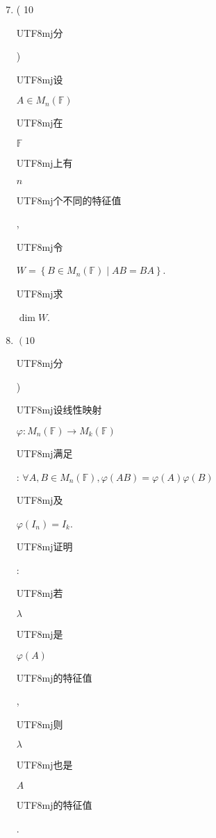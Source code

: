 \documentclass[10pt]{article}
\begin{document}
\begin{enumerate}
  \setcounter{enumi}{6}
  \item ( 10 \begin{CJK}{UTF8}{mj}分\end{CJK}) \begin{CJK}{UTF8}{mj}设\end{CJK} $A \in M_{n}(\mathbb{F})$ \begin{CJK}{UTF8}{mj}在\end{CJK} $\mathbb{F}$ \begin{CJK}{UTF8}{mj}上有\end{CJK} $n$ \begin{CJK}{UTF8}{mj}个不同的特征值\end{CJK}, \begin{CJK}{UTF8}{mj}令\end{CJK} $W=\left\{B \in M_{n}(\mathbb{F}) \mid A B=B A\right\}$. \begin{CJK}{UTF8}{mj}求\end{CJK} $\operatorname{dim} W$.

  \item $\left(10\right.$ \begin{CJK}{UTF8}{mj}分\end{CJK}) \begin{CJK}{UTF8}{mj}设线性映射\end{CJK} $\varphi: M_{n}(\mathbb{F}) \rightarrow M_{k}(\mathbb{F})$ \begin{CJK}{UTF8}{mj}满足\end{CJK}: $\forall A, B \in M_{n}(\mathbb{F}), \varphi(A B)=\varphi(A) \varphi(B)$ \begin{CJK}{UTF8}{mj}及\end{CJK} $\varphi\left(I_{n}\right)=I_{k}$. \begin{CJK}{UTF8}{mj}证明\end{CJK}: \begin{CJK}{UTF8}{mj}若\end{CJK} $\lambda$ \begin{CJK}{UTF8}{mj}是\end{CJK} $\varphi(A)$ \begin{CJK}{UTF8}{mj}的特征值\end{CJK}, \begin{CJK}{UTF8}{mj}则\end{CJK} $\lambda$ \begin{CJK}{UTF8}{mj}也是\end{CJK} $A$ \begin{CJK}{UTF8}{mj}的特征值\end{CJK}.


\end{enumerate}
\end{document}
